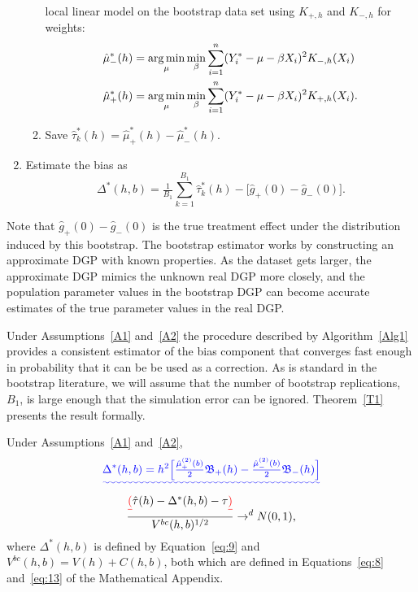 \documentclass[12pt,fleqn]{article}
\providecommand{\DIFadd}[1]{{\protect\color{blue}\uwave{#1}}} %
\providecommand{\DIFdel}[1]{{\protect\color{red}\sout{#1}}}                      %
\providecommand{\DIFaddbegin}{} %
\providecommand{\DIFaddend}{} %
\providecommand{\DIFdelbegin}{} %
\begin{document}
\begin{algorithm}
\begin{enumerate}
\begin{enumerate}
      local linear model on the bootstrap data set using $K_{+,h}$ and $K_{-,h}$ for
      weights:
      \begin{align*}
        \hat\mu_-^*(h)
        &= \operatorname*{arg\,min}_{\mu} \min_{\beta} \sum_{i =1}^n
          (Y_i^* - \mu - \beta X_i)^2 K_{-,h}(X_{i}) \\
        \hat\mu_+^*(h)
        &= \operatorname*{arg\,min}_{\mu} \min_{\beta} \sum_{i = 1}^n
          (Y_i^* - \mu - \beta X_i)^2 K_{+,h}(X_{i}).
      \end{align*}
    \item Save $\hat\tau^*_k(h) = \hat\mu_+^*(h) - \hat\mu_-^*(h)$.
    \end{enumerate}
  \item Estimate the bias as
    \begin{equation}
      \label{eq:9}
      \Delta^*(h,b) = \tfrac{1}{B_1} \sum_{k=1}^{B_1} \hat\tau^*_k(h) -
      \big[\hat g_+(0) - \hat g_-(0)\big].
    \end{equation}
  \end{enumerate}
\end{algorithm}
Note that $\hat g_+(0) - \hat g_-(0)$ is the true treatment effect under the
distribution induced by this bootstrap. The bootstrap estimator works by
constructing an approximate DGP with known properties. As the dataset gets
larger, the approximate DGP mimics the unknown real DGP more closely, and the
population parameter values in the bootstrap DGP can become accurate estimates
of the true parameter values in the real DGP.

Under Assumptions~\ref{A1} and~\ref{A2} the procedure described by
Algorithm~\ref{Alg1} provides a consistent estimator of the bias component that
converges fast enough in probability that it can be be used as a correction. As
is standard in the bootstrap literature, we will assume that the number of
bootstrap replications, $B_{1}$, is large enough that the simulation error can
be ignored. Theorem~\ref{T1} presents the result formally.

\begin{theorem}\label{T1}
  Under Assumptions~\ref{A1} and~\ref{A2},
\DIFaddbegin \begin{equation}
  \DIFadd{\label{eq:18}
  \Delta^*(h,b) = h^{2} \Big[\tfrac{\hat{\mu}_{+}^{(2)}(b)}{2} \Bf_{+}(h)
  - \tfrac{\hat{\mu}_{-}^{(2)}(b)}{2}\Bf_{-}(h) \Big]
}\end{equation}
\DIFadd{almost surely and
}\DIFaddend \begin{equation}
  \label{eq:4}
  \DIFdelbegin \frac{\DIFdel{(}\hat\tau(h) - \Delta^{*}(h,b) - \tau\DIFdel{)}}{ V^{bc}(h, b)^{1/2}} \to^{d} N(0,1),
\end{equation}
where $\Delta^*(h,b)$ is defined by Equation~\eqref{eq:9} and
$V^{bc}(h, b) = V(h) + C(h, b)$, both which are defined in Equations~\eqref{eq:8}
and~\eqref{eq:13} of the Mathematical Appendix.
\end{theorem}
\end{document}
